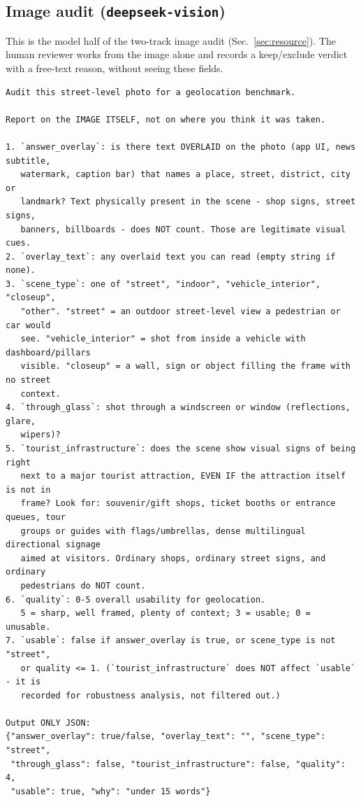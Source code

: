 \documentclass[10pt,a4paper]{article}
\begin{document}
\subsection{Image audit (\texttt{deepseek-vision})}
\label{app:prompt-image}

This is the model half of the two-track image audit (Sec.~\ref{sec:resource}).
The human reviewer works from the image alone and records a keep/exclude verdict
with a free-text reason, without seeing these fields.

\begin{small}
\begin{verbatim}
Audit this street-level photo for a geolocation benchmark.

Report on the IMAGE ITSELF, not on where you think it was taken.

1. `answer_overlay`: is there text OVERLAID on the photo (app UI, news subtitle,
   watermark, caption bar) that names a place, street, district, city or
   landmark? Text physically present in the scene - shop signs, street signs,
   banners, billboards - does NOT count. Those are legitimate visual cues.
2. `overlay_text`: any overlaid text you can read (empty string if none).
3. `scene_type`: one of "street", "indoor", "vehicle_interior", "closeup",
   "other". "street" = an outdoor street-level view a pedestrian or car would
   see. "vehicle_interior" = shot from inside a vehicle with dashboard/pillars
   visible. "closeup" = a wall, sign or object filling the frame with no street
   context.
4. `through_glass`: shot through a windscreen or window (reflections, glare,
   wipers)?
5. `tourist_infrastructure`: does the scene show visual signs of being right
   next to a major tourist attraction, EVEN IF the attraction itself is not in
   frame? Look for: souvenir/gift shops, ticket booths or entrance queues, tour
   groups or guides with flags/umbrellas, dense multilingual directional signage
   aimed at visitors. Ordinary shops, ordinary street signs, and ordinary
   pedestrians do NOT count.
6. `quality`: 0-5 overall usability for geolocation.
   5 = sharp, well framed, plenty of context; 3 = usable; 0 = unusable.
7. `usable`: false if answer_overlay is true, or scene_type is not "street",
   or quality <= 1. (`tourist_infrastructure` does NOT affect `usable` - it is
   recorded for robustness analysis, not filtered out.)

Output ONLY JSON:
{"answer_overlay": true/false, "overlay_text": "", "scene_type": "street",
 "through_glass": false, "tourist_infrastructure": false, "quality": 4,
 "usable": true, "why": "under 15 words"}
\end{verbatim}
\end{small}
\end{document}

